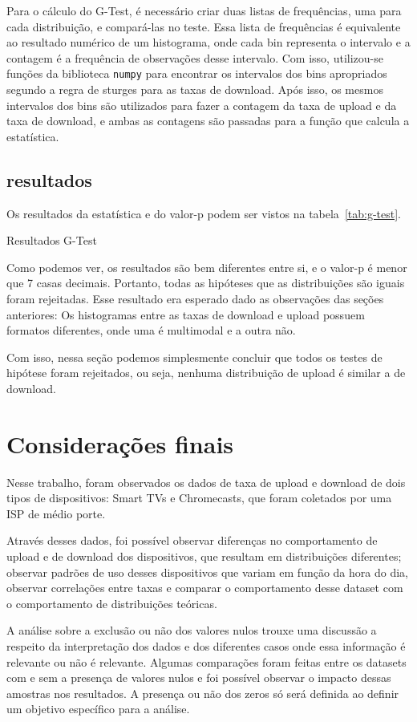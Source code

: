 \documentclass{article}
\begin{document}
Para o cálculo do G-Test, é necessário criar duas listas de frequências, uma para cada distribuição, e compará-las no teste. Essa lista de frequências é equivalente ao resultado numérico de um histograma, onde cada bin representa o intervalo e a contagem é a frequência de observações desse intervalo. Com isso, utilizou-se funções da biblioteca \texttt{numpy} para encontrar os intervalos dos bins apropriados segundo a regra de sturges para as taxas de download. Após isso, os mesmos intervalos dos bins são utilizados para fazer a contagem da taxa de upload e da taxa de download, e ambas as contagens são passadas para a função que calcula a estatística.

\subsection{resultados}

Os resultados da estatística e do valor-p podem ser vistos na tabela~\ref{tab:g-test}.

\begin{table}[h]
	\centering
	
	\caption{Resultados G-Test}
	\label{tab:g-test}
\end{table}

Como podemos ver, os resultados são bem diferentes entre si, e o valor-p é menor que 7 casas decimais. Portanto, todas as hipóteses que as distribuições são iguais foram rejeitadas. Esse resultado era esperado dado as observações das seções anteriores: Os histogramas entre as taxas de download e upload possuem formatos diferentes, onde uma é multimodal e a outra não.

Com isso, nessa seção podemos simplesmente concluir que todos os testes de hipótese foram rejeitados, ou seja, nenhuma distribuição de upload é similar a de download.

\section{Considerações finais}

Nesse trabalho, foram observados os dados de taxa de upload e download de dois tipos de dispositivos: Smart TVs e Chromecasts, que foram coletados por uma ISP de médio porte.

Através desses dados, foi possível observar diferenças no comportamento de upload e de download dos dispositivos, que resultam em distribuições diferentes; observar padrões de uso desses dispositivos que variam em função da hora do dia, observar correlações entre taxas e comparar o comportamento desse dataset com o comportamento de distribuições teóricas.

A análise sobre a exclusão ou não dos valores nulos trouxe uma discussão a respeito da interpretação dos dados e dos diferentes casos onde essa informação é relevante ou não é relevante. Algumas comparações foram feitas entre os datasets com e sem a presença de valores nulos e foi possível observar o impacto dessas amostras nos resultados. A presença ou não dos zeros só será definida ao definir um objetivo específico para a análise.
\end{document}
